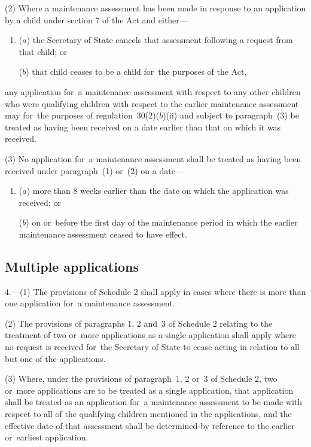 \documentclass[a4paper,12pt]{article}
\begin{document}
(2) Where a maintenance assessment has been made in response to an application by a child under section 7 of the Act and either—
\begin{enumerate}\item[]
($a$) 
the Secretary of State  %
cancels that assessment following a request from that child; or

($b$) that child ceases to be a child for~the purposes of the Act,
\end{enumerate}
any application for~a maintenance assessment with respect to any other children who were qualifying children with respect to the earlier maintenance assessment may for~the purposes of regulation~30(2)($b$)(ii) and subject to paragraph~(3) be treated as having been received on a date earlier than that on which it was received.

(3) No application for~a maintenance assessment shall be treated as having been received under paragraph~(1) or~(2) on a date—
\begin{enumerate}\item[]
($a$) more than 8 weeks earlier than the date on which the application was received; or

($b$) on or~before the first day of the maintenance period in which the earlier maintenance assessment ceased to have effect.
\end{enumerate}


\subsection[4. Multiple applications]{Multiple applications}

4.—(1) The provisions of Schedule 2 shall apply in cases where there is more than one application for~a maintenance assessment.

(2) The provisions of paragraphs 1, 2 and~3 of Schedule 2 relating to the treatment of two or~more applications as a single application shall apply where no request is received for~the Secretary of State to cease acting in relation to all but one of the applications.

(3) Where, under the provisions of paragraph~1, 2 or~3 of Schedule 2, two or~more applications are to be treated as a single application, that application shall be treated as an application for~a maintenance assessment to be made with respect to all of the qualifying children mentioned in the applications, and the effective date of that assessment shall be determined by reference to the earlier or~earliest application.
\end{document}
